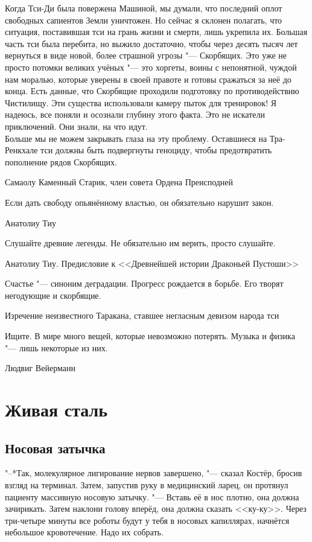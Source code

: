 \epigraph
{Когда Тси-Ди была повержена Машиной, мы думали, что последний оплот свободных сапиентов Земли уничтожен.
Но сейчас я склонен полагать, что ситуация, поставившая тси на грань жизни и смерти, лишь укрепила их.
Большая часть тси была перебита, но выжило достаточно, чтобы через десять тысяч лет вернуться в виде новой, более страшной угрозы "--- Скорбящих.
Это уже не просто потомки великих учёных "--- это хоргеты, воины с непонятной, чуждой нам моралью, которые уверены в своей правоте и готовы сражаться за неё до конца.
Есть данные, что Скорбящие проходили подготовку по противодействию Чистилищу.
Эти существа использовали камеру пыток для тренировок!
Я надеюсь, все поняли и осознали глубину этого факта.
Это не искатели приключений.
Они знали, на что идут.\\
Больше мы не можем закрывать глаза на эту проблему.
Оставшиеся на Тра-Ренкхале тси должны быть подвергнуты геноциду, чтобы предотвратить пополнение рядов Скорбящих.}
{Самаолу Каменный Старик, член совета Ордена Преисподней}

\epigraph
{Если дать свободу опьянённому властью, он обязательно нарушит закон.}
{Анатолиу Тиу}

\epigraph
{Слушайте древние легенды.
Не обязательно им верить, просто слушайте.}
{Анатолиу Тиу.
Предисловие к <<Древнейшей истории Драконьей Пустоши>>}

\epigraph{Счастье "--- синоним деградации.
Прогресс рождается в борьбе.
Его творят негодующие и скорбящие.}
{Изречение неизвестного Таракана, ставшее негласным девизом народа тси}

\epigraph{Ищите.
В мире много вещей, которые невозможно потерять.
Музыка и физика "--- лишь некоторые из них.}
{Людвиг Вейерманн}

\chapter{Живая сталь}

\section{Носовая затычка}

"--*Так, молекулярное лигирование нервов завершено, "--- сказал Костёр, бросив взгляд на терминал. 
Затем, запустив руку в медицинский ларец, он протянул пациенту массивную носовую затычку.
"--- Вставь её в нос плотно, она должна зачирикать.
Затем наклони голову вперёд, она должна сказать <<ку-ку>>.
Через три-четыре минуты все роботы будут у тебя в носовых капиллярах, начнётся небольшое кровотечение.
Надо их собрать.

